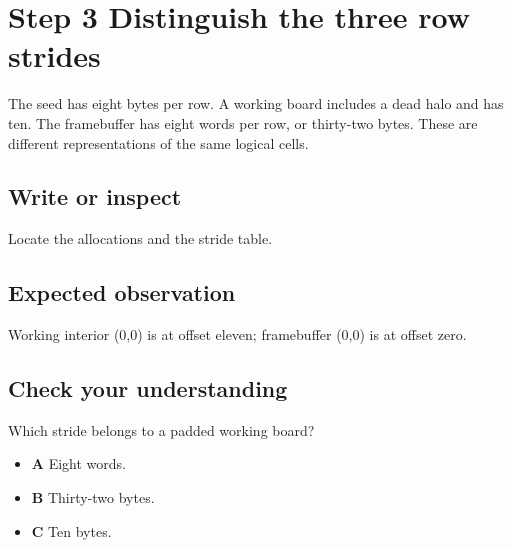 \section{Step 3 Distinguish the three row
  strides}\label{008-life-generations-s03-step-3-distinguish-the-three-row-strides}

The seed has eight bytes per row. A working board includes a dead halo
and has ten. The framebuffer has eight words per row, or thirty-two
bytes. These are different representations of the same logical cells.

\subsection{Write or
  inspect}\label{008-life-generations-s03-write-or-inspect}

Locate the allocations and the stride table.

\subsection{Expected
  observation}\label{008-life-generations-s03-expected-observation}

Working interior (0,0) is at offset eleven; framebuffer (0,0) is at
offset zero.

\subsection{Check your
  understanding}\label{008-life-generations-s03-check-your-understanding}

Which stride belongs to a padded working board?

\begin{itemize}
  \tightlist
  \item
        \textbf{A} Eight words.
  \item
        \textbf{B} Thirty-two bytes.
  \item
        \textbf{C} Ten bytes.
\end{itemize}
